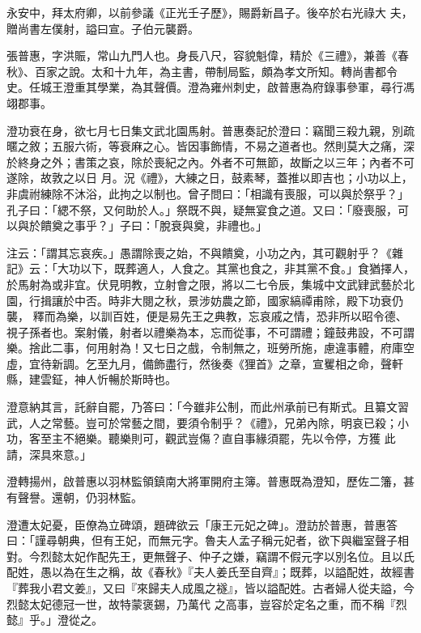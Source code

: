 \begin{pinyinscope}
 永安中，拜太府卿，以前參議《正光壬子歷》，賜爵新昌子。後卒於右光祿大
 夫，贈尚書左僕射，謚曰宣。子伯元襲爵。



 張普惠，字洪賑，常山九門人也。身長八尺，容貌魁偉，精於《三禮》，兼善《春秋》、百家之說。太和十九年，為主書，帶制局監，頗為孝文所知。轉尚書都令史。任城王澄重其學業，為其聲價。澄為雍州刺史，啟普惠為府錄事參軍，尋行馮翊郡事。



 澄功衰在身，欲七月七日集文武北園馬射。普惠奏記於澄曰：竊聞三殺九親，別疏暱之敘；五服六術，等衰麻之心。皆因事飾情，不易之道者也。然則莫大之痛，深於終身之外；書策之哀，除於喪紀之內。外者不可無節，故斷之以三年；內者不可遂除，故敦之以日
 月。況《禮》，大練之日，鼓素琴，蓋推以即吉也；小功以上，非虞祔練除不沐浴，此拘之以制也。曾子問曰：「相識有喪服，可以與於祭乎？」孔子曰：「緦不祭，又何助於人。」祭既不與，疑無宴食之道。又曰：「廢喪服，可以與於饋奠之事乎？」子曰：「脫衰與奠，非禮也。」



 注云：「謂其忘哀疾。」愚謂除喪之始，不與饋奠，小功之內，其可觀射乎？《雜記》云：「大功以下，既葬適人，人食之。其黨也食之，非其黨不食。」食猶擇人，於馬射為或非宜。伏見明教，立射會之限，將以二七令辰，集城中文武肄武藝於北園，行揖讓於中否。時非大閱之秋，景涉妨農之節，國家縞禫甫除，殿下功衰仍襲，
 釋而為樂，以訓百姓，便是易先王之典教，忘哀戚之情，恐非所以昭令德、視子孫者也。案射儀，射者以禮樂為本，忘而從事，不可謂禮；鐘鼓弗設，不可謂樂。捨此二事，何用射為！又七日之戲，令制無之，班勞所施，慮違事體，府庫空虛，宜待新調。乞至九月，備飾盡行，然後奏《狸首》之章，宣矍相之命，聲軒縣，建雲鉦，神人忻暢於斯時也。



 澄意納其言，託辭自罷，乃答曰：「今雖非公制，而此州承前已有斯式。且纂文習武，人之常藝。豈可於常藝之間，要須令制乎？《禮》，兄弟內除，明哀已殺；小功，客至主不絕樂。聽樂則可，觀武豈傷？直自事緣須罷，先以令停，方獲
 此請，深具來意。」



 澄轉揚州，啟普惠以羽林監領鎮南大將軍開府主簿。普惠既為澄知，歷佐二籓，甚有聲譽。還朝，仍羽林監。



 澄遭太妃憂，臣僚為立碑頌，題碑欲云「康王元妃之碑」。澄訪於普惠，普惠答曰：「謹尋朝典，但有王妃，而無元字。魯夫人孟子稱元妃者，欲下與繼室聲子相對。今烈懿太妃作配先王，更無聲子、仲子之嫌，竊謂不假元字以別名位。且以氏配姓，愚以為在生之稱，故《春秋》『夫人姜氏至自齊』；既葬，以謚配姓，故經書『葬我小君文姜』，又曰『來歸夫人成風之襚』，皆以謚配姓。古者婦人從夫謚，今烈懿太妃德冠一世，故特蒙褒錫，乃萬代
 之高事，豈容於定名之重，而不稱『烈懿』乎。」澄從之。




\end{pinyinscope}
